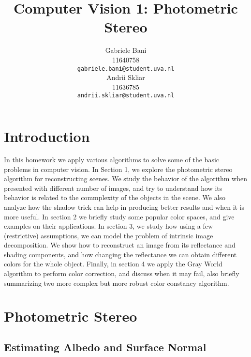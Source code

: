 \documentclass{article}
\title{Computer Vision 1: Photometric Stereo}
\author{
	Gabriele Bani \\
	11640758 \\
  \texttt{gabriele.bani@student.uva.nl} \\
  \And
  	Andrii Skliar \\
  11636785 \\
  \texttt{andrii.skliar@student.uva.nl} \\
}
\begin{document}
\maketitle
\section*{Introduction}

In this homework we apply various algorithms to solve some of the basic problems in computer vision.
In Section 1, we explore the photometric stereo algorithm for reconstructing scenes. We study the behavior of the algorithm when presented with different number of images, and try to understand how its behavior is related to the commplexity of the objects in the scene. We also analyze how the shadow trick can help in producing better results and when it is more useful.
In section 2 we briefly study some popular color spaces, and give examples on their applications. 
In section 3, we study how using a few (restrictive) assumptions, we can model the problem of intrinsic image decomposition. We show how to reconstruct an image from its reflectance and shading components, and how changing the reflectance we can obtain different colors for the whole object.
Finally, in section 4 we apply the Gray World algorithm to perform color correction, and discuss when it may fail, also briefly summarizing two more complex but more robust color constancy algorithm.
\section{Photometric Stereo }

\subsection{Estimating Albedo and Surface Normal}\label{albedo}
\end{document}
